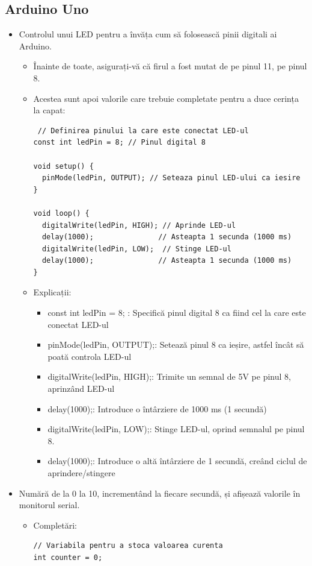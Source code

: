 \documentclass{report}
\begin{document}
\subsection{Arduino Uno}
\begin{itemize}
    \item Controlul unui LED pentru a învăța cum să folosească pinii digitali ai Arduino.
        \begin{itemize}
            \item Înainte de toate, asigurați-vă că firul a fost mutat de pe pinul 11, pe pinul 8.
            \item Acestea sunt apoi valorile care trebuie completate pentru a duce cerința la capat:
                \begin{lstlisting}
 // Definirea pinului la care este conectat LED-ul
const int ledPin = 8; // Pinul digital 8

void setup() {
  pinMode(ledPin, OUTPUT); // Seteaza pinul LED-ului ca iesire
}

void loop() {
  digitalWrite(ledPin, HIGH); // Aprinde LED-ul
  delay(1000);               // Asteapta 1 secunda (1000 ms)
  digitalWrite(ledPin, LOW);  // Stinge LED-ul
  delay(1000);               // Asteapta 1 secunda (1000 ms)
}

                \end{lstlisting}
                \item Explicații:
                    \begin{itemize}
                        \item const int ledPin = 8; : Specifică pinul digital 8 ca fiind cel la care este conectat LED-ul
                        \item pinMode(ledPin, OUTPUT);: Setează pinul 8 ca ieșire, astfel încât să poată controla LED-ul
                        \item digitalWrite(ledPin, HIGH);: Trimite un semnal de 5V pe pinul 8, aprinzând LED-ul
                        \item delay(1000);: Introduce o întârziere de 1000 ms (1 secundă)
                        \item digitalWrite(ledPin, LOW);: Stinge LED-ul, oprind semnalul pe pinul 8.
                        \item delay(1000);: Introduce o altă întârziere de 1 secundă, creând ciclul de aprindere/stingere
                    \end{itemize}
                    
        \end{itemize}
        \item Numără de la 0 la 10, incrementând la fiecare secundă, și afișează valorile în monitorul serial.
        \begin{itemize}
            \item Completări:
                \begin{lstlisting}
// Variabila pentru a stoca valoarea curenta
int counter = 0;


\end{lstlisting}
\end{itemize}
\end{itemize}
\end{document}
